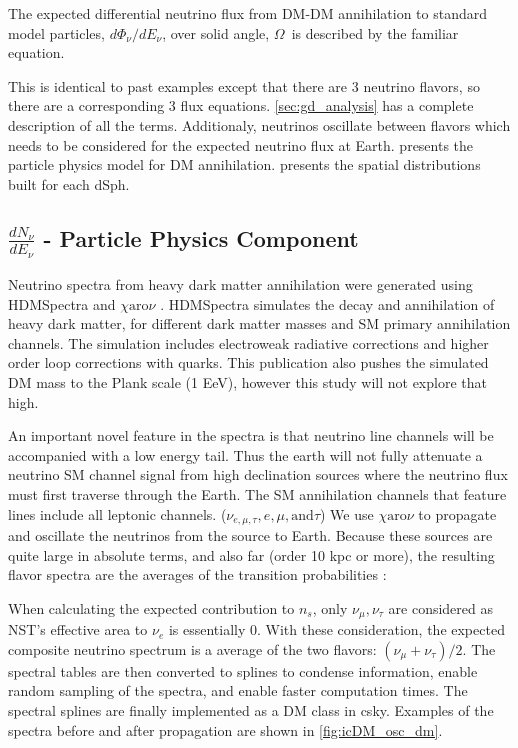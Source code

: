 The expected differential neutrino flux from DM-DM annihilation to standard model
particles, $d\Phi_{\nu}/dE_{\nu}$, over solid angle, $\Omega$~is described by the familiar equation.
\iddmannilation[\nu]

This is identical to past examples except that there are 3 neutrino flavors, so there are a corresponding 3 flux equations.
\cref{sec:gd_analysis} has a complete description of all the terms.
Additionaly, neutrinos oscillate between flavors which needs to be considered for the expected neutrino flux at Earth.
 presents the particle physics model for DM annihilation.
 presents the spatial distributions built for each dSph.

\subsection{$\frac{dN_\nu}{dE_\nu}$ - Particle Physics Component}\label{sec:icDM_particlephysics}

Neutrino spectra from heavy dark matter annihilation were generated using HDMSpectra \cite{HDMSpectra} and $\chi \textrm{aro}\nu$ \cite{Charon}.
HDMSpectra simulates the decay and annihilation of heavy dark matter, for different dark matter masses and SM primary annihilation channels.
The simulation includes electroweak radiative corrections and higher order loop corrections with quarks.
This publication also pushes the simulated DM mass to the Plank scale (1 EeV), however this study will not explore that high.

An important novel feature in the spectra is that neutrino line channels will be accompanied with a low energy tail.
Thus the earth will not fully attenuate a neutrino SM channel signal from high declination sources where the neutrino flux must first traverse through the Earth.
The SM annihilation channels that feature lines include all leptonic channels. ($\nu_{e,\mu,\tau}, e, \mu, \mathrm{and} \tau$)
We use \href{https://iopscience.iop.org/article/10.1088/1475-7516/2020/10/043}{ $\chi \mathrm{aro}\nu$} to propagate and oscillate the neutrinos from the source to Earth.
Because these sources are quite large in absolute terms, and also far (order 10 kpc or more), the resulting flavor spectra are the averages of the transition probabilities \cite{Charon}:
\nuOscMatrix

When calculating the expected contribution to $n_s$, only $ \nu_\mu, \nu_\tau $ are considered as NST's effective area to $ \nu_e $ is essentially 0.
With these consideration, the expected composite neutrino spectrum is a average of the two flavors: $ (\nu_\mu + \nu_\tau)/2 $.
The spectral tables are then converted to splines to condense information, enable random sampling of the spectra, and enable faster computation times.
The spectral splines are finally implemented as a DM class in csky.
Examples of the spectra before and after propagation are shown in \cref{fig:icDM_osc_dm}.


